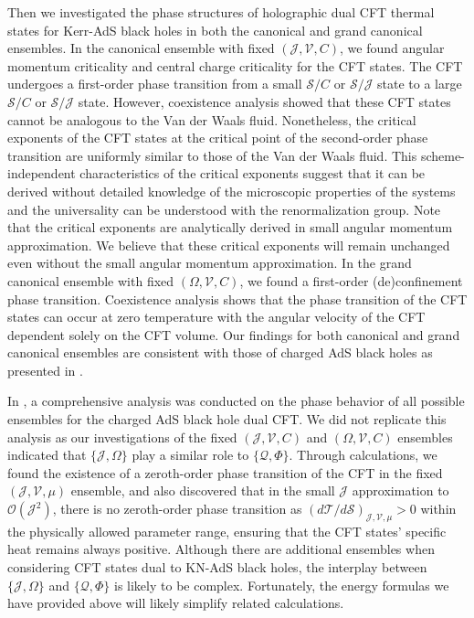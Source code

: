 \documentclass[a4paper,11pt]{article}
\def\T{\mathcal{T}} \def\O{\mathcal{O}} \def\S{\mathcal{S}}\def\J{\mathcal{J}}\def\V{\mathcal{V}}\def\Q{\mathcal{Q}}\def\F{\mathcal{F}}
\begin{document}
Then we investigated the phase structures of holographic dual CFT thermal states for Kerr-AdS black holes in both the canonical and grand canonical ensembles. In the canonical ensemble with fixed $(\J, \V, C)$, we found angular momentum criticality and central charge criticality for the CFT states. The CFT undergoes a first-order phase transition from a small $\S/C$ or $\S/\J$ state to a large $\S/C$ or $\S/\J$ state. However, coexistence analysis showed that these CFT states cannot be analogous to the Van der Waals fluid. Nonetheless, the critical exponents of the CFT states at the critical point of the second-order phase transition are uniformly similar to those of the Van der Waals fluid. This scheme-independent characteristics of the critical exponents suggest that it can be derived without detailed knowledge of the microscopic properties of the systems and the universality can be understood with the renormalization group. Note that the critical exponents are analytically derived in small angular momentum approximation. We believe that these critical exponents will remain unchanged even without the small angular momentum approximation. In the grand canonical ensemble with fixed $(\Omega, \V, C)$, we found a first-order (de)confinement phase transition. Coexistence analysis shows that the phase transition of the CFT states can occur at zero temperature with the angular velocity of the CFT dependent solely on the CFT volume. Our findings for both canonical and grand canonical ensembles are consistent with those of charged AdS black holes as presented in \cite{Cong:2021jgb}.

In \cite{Cong:2021jgb}, a comprehensive analysis was conducted on the phase behavior of all possible ensembles for the charged AdS black hole dual CFT. We did not replicate this analysis as our investigations of the fixed $(\J, \V, C)$ and $(\Omega, \V, C)$ ensembles indicated that $\{\J,\Omega\}$ play a similar role to $\{\Q,\Phi\}$. Through calculations, we found the existence of a zeroth-order phase transition of the CFT in the fixed $(\J, \V, \mu)$ ensemble, and also discovered that in the small $\J$ approximation to $\O(\J^2)$, there is no zeroth-order phase transition as $(d\T/d\S)_{\J, \V, \mu}>0$ within the physically allowed parameter range, ensuring that the CFT states' specific heat remains always positive. Although there are additional ensembles when considering CFT states dual to KN-AdS black holes, the interplay between $\{\J,\Omega\}$ and $\{\Q,\Phi\}$ is likely to be complex. Fortunately, the energy formulas we have provided above will likely simplify related calculations.
\end{document}
